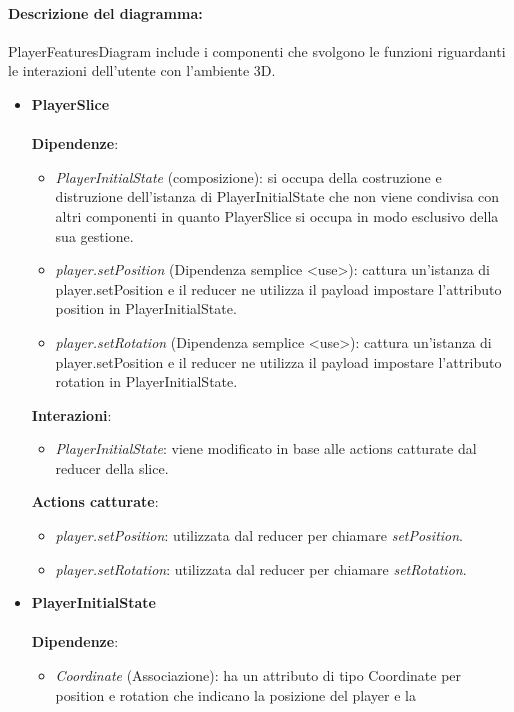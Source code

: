 		\paragraph*{Descrizione del diagramma:}
		PlayerFeaturesDiagram include i componenti che svolgono le funzioni riguardanti le interazioni dell'utente con 
		l'ambiente 3D.
\begin{itemize}
		\item \textbf{PlayerSlice}
		\\\\
		\textbf{Dipendenze}:
		\begin{itemize}
			\item \textit{PlayerInitialState} (composizione): si occupa della costruzione e distruzione dell'istanza di PlayerInitialState
			che non viene condivisa con altri componenti in quanto PlayerSlice si occupa in modo esclusivo della sua gestione.
			\item \textit{player.setPosition} (Dipendenza semplice \textless use\textgreater): cattura un'istanza di player.setPosition e il 
			reducer ne utilizza il payload impostare l'attributo position in PlayerInitialState.
			\item \textit{player.setRotation} (Dipendenza semplice \textless use\textgreater): cattura un'istanza di player.setPosition e il 
			reducer ne utilizza il payload impostare l'attributo rotation in PlayerInitialState.
		\end{itemize}
		\textbf{Interazioni}:
		\begin{itemize}
			\item \textit{PlayerInitialState}: viene modificato in base alle actions catturate dal reducer della slice.
		\end{itemize}
		\textbf{Actions catturate}:
		\begin{itemize}
			\item \textit{player.setPosition}: utilizzata dal reducer per chiamare \textit{setPosition}.
			\item \textit{player.setRotation}: utilizzata dal reducer per chiamare \textit{setRotation}.
		\end{itemize}
		\item \textbf{PlayerInitialState}
		\\\\
		\textbf{Dipendenze}:
		\begin{itemize}
			\item \textit{Coordinate} (Associazione): ha un attributo di tipo Coordinate per position e rotation che indicano la posizione del player e la 

\end{itemize}
\end{itemize}
